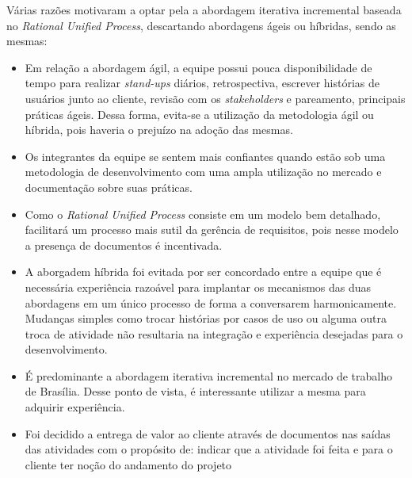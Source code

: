 Várias razões motivaram a optar pela a abordagem iterativa incremental baseada no \textit{Rational Unified Process}, descartando abordagens ágeis ou híbridas, sendo as mesmas:
\begin{itemize}
\item Em relação a abordagem ágil, a equipe possui pouca disponibilidade de tempo para realizar \textit{stand-ups} diários, retrospectiva, escrever histórias de usuários junto ao cliente, revisão com os \textit{stakeholders} e pareamento, principais práticas ágeis. Dessa forma, evita-se a utilização da metodologia ágil ou híbrida, pois haveria o prejuízo na adoção das mesmas.
\item Os integrantes da equipe se sentem mais confiantes quando estão sob uma metodologia de desenvolvimento com uma ampla utilização no mercado e documentação sobre suas práticas.
\item Como o \textit{Rational Unified Process} consiste em um modelo bem detalhado, facilitará um processo mais sutil da gerência de requisitos, pois nesse modelo a presença de documentos é incentivada.
\item A aborgadem híbrida foi evitada por ser concordado entre a equipe que é necessária experiência razoável para implantar os mecanismos das duas abordagens em um único processo de forma a conversarem harmonicamente. Mudanças simples como trocar histórias por casos de uso ou alguma outra troca de atividade não resultaria na integração e experiência desejadas para o desenvolvimento.
\item É predominante a abordagem iterativa incremental no mercado de trabalho de Brasília. Desse ponto de vista, é interessante utilizar a mesma para adquirir experiência.
\item Foi decidido a entrega de valor ao cliente através de documentos nas saídas das atividades com o propósito de: indicar que a atividade foi feita e para o cliente ter noção do andamento do projeto
\end{itemize}








